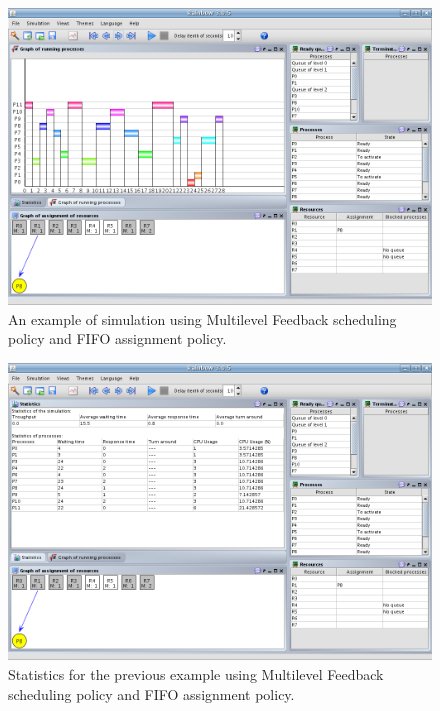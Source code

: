 \documentclass[10pt,a4paper,twoside,titlepage]{article}
\begin{document}
\begin{figure}[tb]
	\begin{center}
		\includegraphics[scale=0.4]{rainbow_simulation}
		\caption[An example of simulation]{An example of simulation using Multilevel Feedback scheduling policy and FIFO assignment policy.}
		\label{fig:rainbow_simulation}
	\end{center}
\end{figure}
\begin{figure}[tb]
	\begin{center}
		\includegraphics[scale=0.4]{rainbow_statistics}
		\caption[An example of statistics view]{Statistics for the previous example using Multilevel Feedback scheduling policy and FIFO assignment policy.}
		\label{fig:rainbow_statistics}
	\end{center}
\end{figure}
\end{document}
